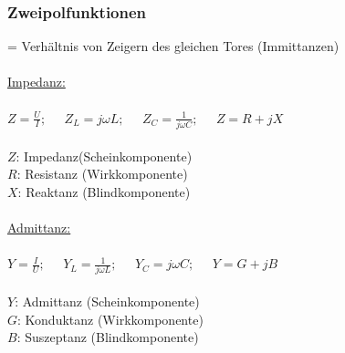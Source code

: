 \documentclass[a4paper,twocolumn,10pt]{article}
\begin{document}
\subsubsection*{Zweipolfunktionen}
= Verhältnis von Zeigern des gleichen Tores (Immittanzen)\\\\
\underline{Impedanz:}\\\\
$Z=\frac{U}{I};\;\;\;\;\;Z_L=j\omega L;\;\;\;\;\;Z_C=\frac{1}{j\omega C};\;\;\;\;\;Z=R+jX$\\\\
$Z$: Impedanz(Scheinkomponente)\\
$R$: Resistanz (Wirkkomponente)\\
$X$: Reaktanz (Blindkomponente)\\\\
\underline{Admittanz:}\\\\
$Y=\frac{I}{U};\;\;\;\;\;Y_L=\frac{1}{j\omega L};\;\;\;\;\;Y_C=j\omega C;\;\;\;\;\;Y=G+jB$\\\\
$Y$: Admittanz (Scheinkomponente)\\
$G$: Konduktanz (Wirkkomponente)\\
$B$: Suszeptanz (Blindkomponente)
\end{document}

